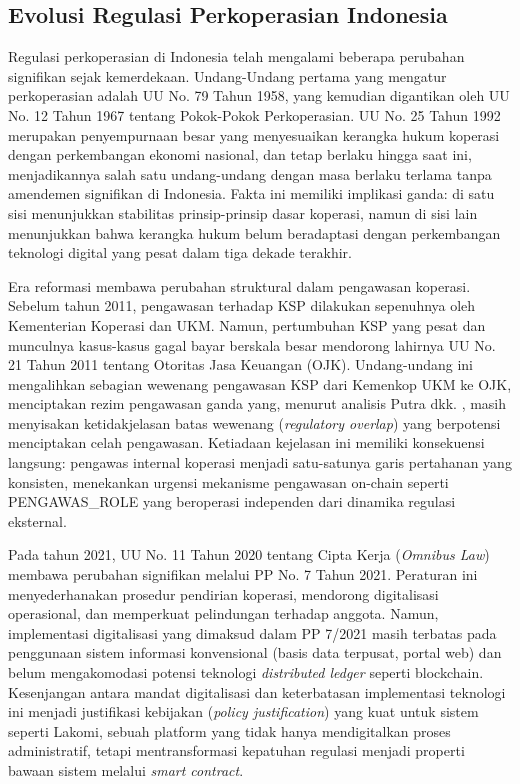 \subsection{Evolusi Regulasi Perkoperasian Indonesia}

Regulasi perkoperasian di Indonesia telah mengalami beberapa perubahan signifikan sejak kemerdekaan. Undang-Undang pertama yang mengatur perkoperasian adalah UU No. 79 Tahun 1958, yang kemudian digantikan oleh UU No. 12 Tahun 1967 tentang Pokok-Pokok Perkoperasian. UU No. 25 Tahun 1992 merupakan penyempurnaan besar yang menyesuaikan kerangka hukum koperasi dengan perkembangan ekonomi nasional, dan tetap berlaku hingga saat ini, menjadikannya salah satu undang-undang dengan masa berlaku terlama tanpa amendemen signifikan di Indonesia. Fakta ini memiliki implikasi ganda: di satu sisi menunjukkan stabilitas prinsip-prinsip dasar koperasi, namun di sisi lain menunjukkan bahwa kerangka hukum belum beradaptasi dengan perkembangan teknologi digital yang pesat dalam tiga dekade terakhir.

Era reformasi membawa perubahan struktural dalam pengawasan koperasi. Sebelum tahun 2011, pengawasan terhadap KSP dilakukan sepenuhnya oleh Kementerian Koperasi dan UKM. Namun, pertumbuhan KSP yang pesat dan munculnya kasus-kasus gagal bayar berskala besar mendorong lahirnya UU No. 21 Tahun 2011 tentang Otoritas Jasa Keuangan (OJK). Undang-undang ini mengalihkan sebagian wewenang pengawasan KSP dari Kemenkop UKM ke OJK, menciptakan rezim pengawasan ganda yang, menurut analisis Putra dkk. \cite{putra2025dualisme}, masih menyisakan ketidakjelasan batas wewenang (\textit{regulatory overlap}) yang berpotensi menciptakan celah pengawasan. Ketiadaan kejelasan ini memiliki konsekuensi langsung: pengawas internal koperasi menjadi satu-satunya garis pertahanan yang konsisten, menekankan urgensi mekanisme pengawasan on-chain seperti PENGAWAS\_ROLE yang beroperasi independen dari dinamika regulasi eksternal.

Pada tahun 2021, UU No. 11 Tahun 2020 tentang Cipta Kerja (\textit{Omnibus Law}) membawa perubahan signifikan melalui PP No. 7 Tahun 2021. Peraturan ini menyederhanakan prosedur pendirian koperasi, mendorong digitalisasi operasional, dan memperkuat pelindungan terhadap anggota. Namun, implementasi digitalisasi yang dimaksud dalam PP 7/2021 masih terbatas pada penggunaan sistem informasi konvensional (basis data terpusat, portal web) dan belum mengakomodasi potensi teknologi \textit{distributed ledger} seperti blockchain. Kesenjangan antara mandat digitalisasi dan keterbatasan implementasi teknologi ini menjadi justifikasi kebijakan (\textit{policy justification}) yang kuat untuk sistem seperti Lakomi, sebuah platform yang tidak hanya mendigitalkan proses administratif, tetapi mentransformasi kepatuhan regulasi menjadi properti bawaan sistem melalui \textit{smart contract}.

